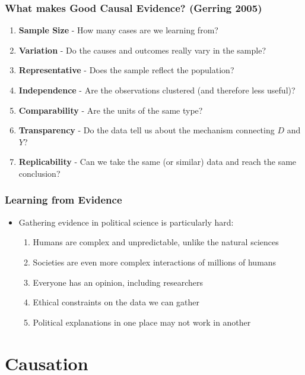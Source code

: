 \documentclass[xcolor=x11names,compress]{beamer}\usepackage[]{graphicx}\usepackage[]{xcolor}
\renewcommand{\(}{\begin{columns}}
\renewcommand{\)}{\end{columns}}
\newcommand{\<}[1]{\begin{column}{#1}}
\renewcommand{\>}{\end{column}}
\begin{document}




\begin{frame}
\frametitle{What makes Good Causal Evidence? (Gerring 2005)}
\begin{enumerate}
\item \textbf{Sample Size} - How many cases are we learning from?
\pause
\item \textbf{Variation} - Do the causes and outcomes really vary in the sample?
\pause
\item \textbf{Representative} - Does the sample reflect the population?
\pause
\item \textbf{Independence} - Are the observations clustered (and therefore less useful)?
\pause
\item \textbf{Comparability} - Are the units of the same type?
\pause
\item \textbf{Transparency} - Do the data tell us about the mechanism connecting $D$ and $Y$?
\pause
\item \textbf{Replicability} - Can we take the same (or similar) data and reach the same conclusion?
\end{enumerate}
\end{frame}

\begin{frame}
\frametitle{Learning from Evidence}
\begin{itemize}
\item Gathering evidence in political science is particularly hard:
\pause
\begin{enumerate}
\item Humans are complex and unpredictable, unlike the natural sciences
\pause
\item Societies are even more complex interactions of millions of humans
\pause
\item Everyone has an opinion, including researchers
\pause
\item Ethical constraints on the data we can gather
\pause
\item Political explanations in one place may not work in another
\end{enumerate}
\end{itemize}
\end{frame}

\section{Causation}
\end{document}
